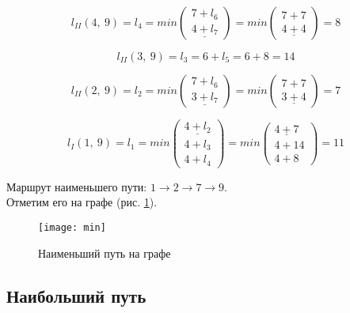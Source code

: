 \begin{equation*}
	l_{II}(4,\ 9) = l_4 = min \begin{pmatrix} 7 + l_6 \\ \underline{4 + l_7} \end{pmatrix} = min \begin{pmatrix} 7 + 7 \\ \underline{4 + 4} \end{pmatrix} = 8
\end{equation*}

\begin{equation*}
	l_{II}(3,\ 9) = l_3 = 6 + l_5 = 6 + 8 = 14
\end{equation*}

\begin{equation*}
	l_{II}(2,\ 9) = l_2 = min \begin{pmatrix} 7 + l_6 \\ \underline{3 + l_7} \end{pmatrix} = min \begin{pmatrix} 7 + 7 \\ \underline{3 + 4} \end{pmatrix} = 7
\end{equation*}

\begin{equation*}
	l_{I}(1,\ 9) = l_1 = min \begin{pmatrix} \underline{4 + l_2} \\ 4 + l_3 \\ 4 + l_4 \end{pmatrix} = min \begin{pmatrix} \underline{4 + 7} \\ 4 + 14 \\ 4 + 8 \end{pmatrix} = 11
\end{equation*}

Маршрут наименьшего пути: $1 \rightarrow 2 \rightarrow 7 \rightarrow 9$.\\ Отметим его на графе (рис. \ref{pic:min}).

\begin{figure}[H]
\begin{center}
	\texttt{[image: min]}
	\caption{Наименьший путь на графе}
	\label{pic:min}
\end{center}
\end{figure}

\subsection{Наибольший путь}

